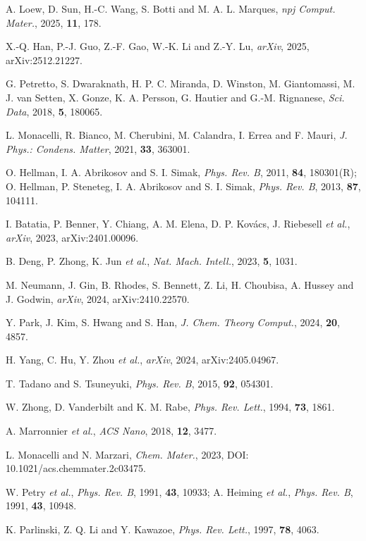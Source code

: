 \documentclass{article}
\begin{document}
\small
\begin{enumerate}[leftmargin=*,itemsep=0pt,topsep=2pt,label={[\arabic*]}]
\item A. Loew, D. Sun, H.-C. Wang, S. Botti and M. A. L. Marques, \textit{npj Comput. Mater.}, 2025, \textbf{11}, 178.
\item X.-Q. Han, P.-J. Guo, Z.-F. Gao, W.-K. Li and Z.-Y. Lu, \textit{arXiv}, 2025, arXiv:2512.21227.
\item G. Petretto, S. Dwaraknath, H. P. C. Miranda, D. Winston, M. Giantomassi, M. J. van Setten, X. Gonze, K. A. Persson, G. Hautier and G.-M. Rignanese, \textit{Sci. Data}, 2018, \textbf{5}, 180065.
\item L. Monacelli, R. Bianco, M. Cherubini, M. Calandra, I. Errea and F. Mauri, \textit{J. Phys.: Condens. Matter}, 2021, \textbf{33}, 363001.
\item O. Hellman, I. A. Abrikosov and S. I. Simak, \textit{Phys. Rev. B}, 2011, \textbf{84}, 180301(R); O. Hellman, P. Steneteg, I. A. Abrikosov and S. I. Simak, \textit{Phys. Rev. B}, 2013, \textbf{87}, 104111.
\item I. Batatia, P. Benner, Y. Chiang, A. M. Elena, D. P. Kov\'{a}cs, J. Riebesell \textit{et al.}, \textit{arXiv}, 2023, arXiv:2401.00096.
\item B. Deng, P. Zhong, K. Jun \textit{et al.}, \textit{Nat. Mach. Intell.}, 2023, \textbf{5}, 1031.
\item M. Neumann, J. Gin, B. Rhodes, S. Bennett, Z. Li, H. Choubisa, A. Hussey and J. Godwin, \textit{arXiv}, 2024, arXiv:2410.22570.
\item Y. Park, J. Kim, S. Hwang and S. Han, \textit{J. Chem. Theory Comput.}, 2024, \textbf{20}, 4857.
\item H. Yang, C. Hu, Y. Zhou \textit{et al.}, \textit{arXiv}, 2024, arXiv:2405.04967.
\item T. Tadano and S. Tsuneyuki, \textit{Phys. Rev. B}, 2015, \textbf{92}, 054301.
\item W. Zhong, D. Vanderbilt and K. M. Rabe, \textit{Phys. Rev. Lett.}, 1994, \textbf{73}, 1861.
\item A. Marronnier \textit{et al.}, \textit{ACS Nano}, 2018, \textbf{12}, 3477.
\item L. Monacelli and N. Marzari, \textit{Chem. Mater.}, 2023, DOI: 10.1021/acs.chemmater.2c03475.
\item W. Petry \textit{et al.}, \textit{Phys. Rev. B}, 1991, \textbf{43}, 10933; A. Heiming \textit{et al.}, \textit{Phys. Rev. B}, 1991, \textbf{43}, 10948.
\item K. Parlinski, Z. Q. Li and Y. Kawazoe, \textit{Phys. Rev. Lett.}, 1997, \textbf{78}, 4063.

\end{enumerate}
\end{document}
